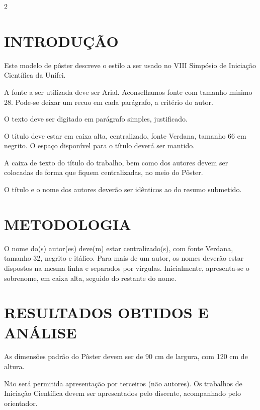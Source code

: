\documentclass[portrait]{a0poster}
\newcommand{\posterbody}{\fontfamily{fvs}\selectfont}
\newcommand{\postertext}{%
  \posterbody
  \fontsize{29}{42}\selectfont
  \justifying
  \setlength{\parindent}{2.0cm}%
}
\begin{document}
\begin{multicols}{2}
\postertext

\section*{INTRODUÇÃO}

Este modelo de pôster descreve o estilo a ser usado no VIII Simpósio de
Iniciação Científica da Unifei.

A fonte a ser utilizada deve ser Arial. Aconselhamos fonte com tamanho
mínimo 28. Pode-se deixar um recuo em cada parágrafo, a critério do autor.

O texto deve ser digitado em parágrafo simples, justificado.

O título deve estar em caixa alta, centralizado, fonte Verdana, tamanho 66
em negrito. O espaço disponível para o título deverá ser mantido.

A caixa de texto do título do trabalho, bem como dos autores devem ser
colocadas de forma que fiquem centralizadas, no meio do Pôster.

O título e o nome dos autores deverão ser idênticos ao do resumo submetido.

\vspace{2.0cm}
\section*{METODOLOGIA}

O nome do(s) autor(es) deve(m) estar centralizado(s), com fonte Verdana,
tamanho 32, negrito e itálico. Para mais de um autor, os nomes deverão estar
dispostos na mesma linha e separados por vírgulas. Inicialmente, apresenta-se
o sobrenome, em caixa alta, seguido do restante do nome.

\vspace{1.2cm}
\section*{RESULTADOS OBTIDOS E ANÁLISE}

As dimensões padrão do Pôster devem ser de 90 cm de largura, com 120 cm de
altura.

Não será permitida apresentação por terceiros (não autores). Os trabalhos
de Iniciação Científica devem ser apresentados pelo discente, acompanhado
pelo orientador.


\end{multicols}
\end{document}
